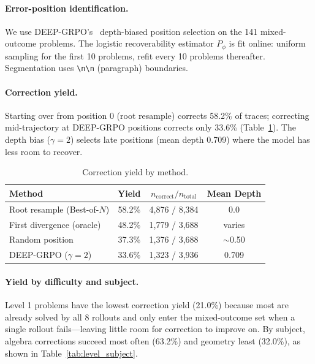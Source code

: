 \documentclass{article}
\begin{document}
\paragraph{Error-position identification.}
We use DEEP-GRPO's~\cite{deepgrpo2026} depth-biased position selection on the 141 mixed-outcome problems.
The logistic recoverability estimator $P_\phi$ is fit online: uniform sampling for the first 10 problems, refit every 10 problems thereafter.
Segmentation uses \texttt{\textbackslash n\textbackslash n} (paragraph) boundaries.

\paragraph{Correction yield.}
Starting over from position 0 (root resample) corrects 58.2\% of traces; correcting mid-trajectory at DEEP-GRPO positions corrects only 33.6\% (Table~\ref{tab:yield}).
The depth bias ($\gamma = 2$) selects late positions (mean depth 0.709) where the model has less room to recover.

\begin{table}[h]
    \centering
    \caption{Correction yield by method.}
    \vspace{0.5em}
    \begin{tabular}{lccc}
        \toprule
        Method & Yield & $n_{\text{correct}} / n_{\text{total}}$ & Mean Depth \\
        \midrule
        Root resample (Best-of-$N$) & 58.2\% & 4,876 / 8,384 & 0.0 \\
        First divergence (oracle) & 48.2\% & 1,779 / 3,688 & varies \\
        Random position & 37.3\% & 1,376 / 3,688 & $\sim$0.50 \\
        DEEP-GRPO ($\gamma = 2$) & 33.6\% & 1,323 / 3,936 & 0.709 \\
        \bottomrule
    \end{tabular}
    \label{tab:yield}
\end{table}

\paragraph{Yield by difficulty and subject.}
Level 1 problems have the lowest correction yield (21.0\%) because most are already solved by all 8 rollouts and only enter the mixed-outcome set when a single rollout fails---leaving little room for correction to improve on.
By subject, algebra corrections succeed most often (63.2\%) and geometry least (32.0\%), as shown in Table~\ref{tab:level_subject}.
\end{document}

